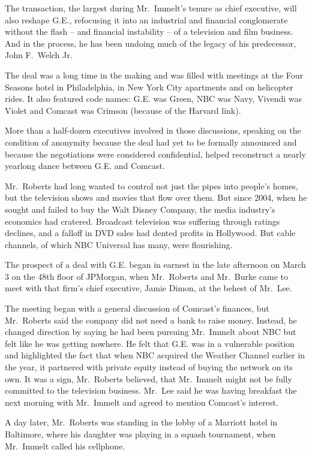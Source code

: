﻿\documentclass[12pt]{article}
\begin{document}
The transaction, the largest during Mr.~Immelt's tenure as chief executive, will also reshape G.E.,
refocusing it into an industrial and financial conglomerate without the flash -- and financial
instability -- of a television and film business. And in the process, he has been undoing much of
the legacy of his predecessor, John F.~Welch Jr.

The deal was a long time in the making and was filled with meetings at the Four Seasons hotel in
Philadelphia, in New York City apartments and on helicopter rides. It also featured code names: G.E.
was Green, NBC was Navy, Vivendi was Violet and Comcast was Crimson (because of the Harvard link).

More than a half-dozen executives involved in those discussions, speaking on the condition of
anonymity because the deal had yet to be formally announced and because the negotiations were
considered confidential, helped reconstruct a nearly yearlong dance between G.E. and Comcast.

Mr.~Roberts had long wanted to control not just the pipes into people's homes, but the television
shows and movies that flow over them. But since 2004, when he sought and failed to buy the Walt
Disney Company, the media industry's economics had cratered. Broadcast television was suffering
through ratings declines, and a falloff in DVD sales had dented profits in Hollywood. But cable
channels, of which NBC Universal has many, were flourishing.

The prospect of a deal with G.E. began in earnest in the late afternoon on March 3 on the 48th floor
of JPMorgan, when Mr.~Roberts and Mr.~Burke came to meet with that firm's chief executive, Jamie
Dimon, at the behest of Mr.~Lee.

The meeting began with a general discussion of Comcast's finances, but Mr.~Roberts said the company
did not need a bank to raise money. Instead, he changed direction by saying he had been pursuing
Mr.~Immelt about NBC but felt like he was getting nowhere. He felt that G.E. was in a vulnerable
position and highlighted the fact that when NBC acquired the Weather Channel earlier in the year, it
partnered with private equity instead of buying the network on its own. It was a sign, Mr.~Roberts
believed, that Mr.~Immelt might not be fully committed to the television business. Mr.~Lee said he
was having breakfast the next morning with Mr.~Immelt and agreed to mention Comcast's interest.

A day later, Mr.~Roberts was standing in the lobby of a Marriott hotel in Baltimore, where his
daughter was playing in a squash tournament, when Mr.~Immelt called his cellphone.
\end{document}
